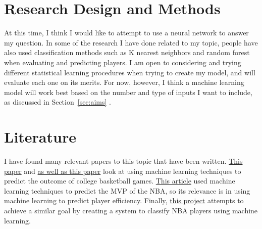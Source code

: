 \documentclass[12pt]{article}
\begin{document}
\section{Research Design and Methods}
\label{sec:rdam}
At this time, I think I would like to attempt to use a neural network to answer my question. In some of the research I have done related to my topic, people have also used classification methods such as K nearest neighbors and random forest when evaluating and predicting players. I am open to considering and trying different statistical learning procedures when trying to create my model, and will evaluate each one on its merits. For now, however, I think a machine learning model will work best based on the number and type of inputs I want to include, as discussed in Section~\ref{sec:aims} .


\section{Literature}
\label{sec:lit}
I have found many relevant papers to this topic that have been written. \href{https://libraetd.lib.virginia.edu/downloads/sn009z84g?filename=Mente_Sindhura_Accuracy_of_Machine_Learning_Algorithms_in_Predicting_College_Basketball_Games.pdf}{This paper} and \href{https://www.researchgate.net/publication/257749099_Predicting_college_basketball_match_outcomes_using_machine_learning_techniques_some_results_and_lessons_learned}{as well as this paper} look at using machine learning techniques to predict the outcome of college basketball games. \href{https://towardsdatascience.com/predicting-2020-21-nbas-most-valuable-player-using-machine-learning-24aaa869a740}{This article} used machine learning techniques to predict the MVP of the NBA, so its relevance is in using machine learning to predict player efficiency. Finally, \href{https://briannalytle7.medium.com/reclassifying-nba-players-using-machine-learning-c2a316875fd1}{this project} attempts to achieve a similar goal by creating a system to classify NBA players using machine learning.
\end{document}
